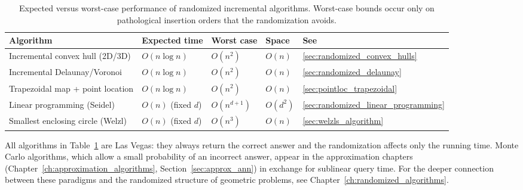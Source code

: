 \begin{table}[htbp]
\centering
\begin{tabular}{lllll}
\toprule
Algorithm & Expected time & Worst case & Space & See \\
\midrule
Incremental convex hull (2D/3D) & $O(n\log n)$ & $O(n^2)$ & $O(n)$ & \ref{sec:randomized_convex_hulls} \\
Incremental Delaunay/Voronoi    & $O(n\log n)$ & $O(n^2)$ & $O(n)$ & \ref{sec:randomized_delaunay} \\
Trapezoidal map + point location & $O(n\log n)$ & $O(n^2)$ & $O(n)$ & \ref{sec:pointloc_trapezoidal} \\
Linear programming (Seidel)     & $O(n)$ (fixed $d$) & $O(n^{d+1})$ & $O(d^2)$ & \ref{sec:randomized_linear_programming} \\
Smallest enclosing circle (Welzl) & $O(n)$ (fixed $d$) & $O(n^3)$ & $O(n)$ & \ref{sec:welzls_algorithm} \\
\bottomrule
\end{tabular}
\caption{Expected versus worst-case performance of randomized
incremental algorithms. Worst-case bounds occur only on pathological
insertion orders that the randomization avoids.}
\label{tbl:appalgs_randomized}
\end{table}

All algorithms in Table~\ref{tbl:appalgs_randomized} are Las Vegas: they
always return the correct answer and the randomization affects only the
running time. Monte Carlo algorithms, which allow a small probability of
an incorrect answer, appear in the approximation chapters
(Chapter~\ref{ch:approximation_algorithms}, Section~\ref{sec:approx_ann})
in exchange for sublinear query time. For the deeper connection between
these paradigms and the randomized structure of geometric problems, see
Chapter~\ref{ch:randomized_algorithms}.
